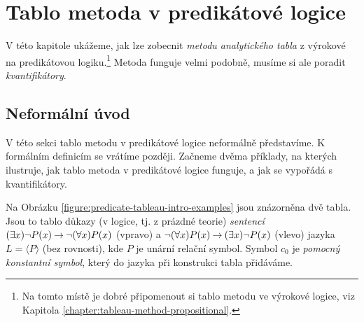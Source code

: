 \chapter{Tablo metoda v predikátové logice}

V této kapitole ukážeme, jak lze zobecnit \emph{metodu analytického tabla} z výrokové na predikátovou logiku.\footnote{Na tomto místě je dobré připomenout si tablo metodu ve výrokové logice, viz Kapitola \ref{chapter:tableau-method-propositional}.} Metoda funguje velmi podobně, musíme si ale poradit \emph{kvantifikátory}.

\section{Neformální úvod}

V této sekci tablo metodu v predikátové logice neformálně představíme. K formálním definicím se vrátíme později. Začneme dvěma příklady, na kterých ilustruje, jak tablo metoda v predikátové logice funguje, a jak se vypořádá s kvantifikátory.

\begin{example} Na Obrázku \ref{figure:predicate-tableau-intro-examples} jsou znázorněna dvě tabla. Jsou to tablo důkazy (v logice, tj. z prázdné teorie) \emph{sentencí} $(\exists x)\neg P(x)\mathbin{\rightarrow}\neg(\forall x)P(x)$ (vpravo) a $\neg(\forall x)P(x)\mathbin{\rightarrow}(\exists x)\neg P(x)$ (vlevo) jazyka $L=\langle P\rangle$ (bez rovnosti), kde $P$ je unární relační symbol. Symbol $c_0$ je \emph{pomocný konstantní symbol}, který do jazyka při konstrukci tabla přidáváme.
\end{example}



